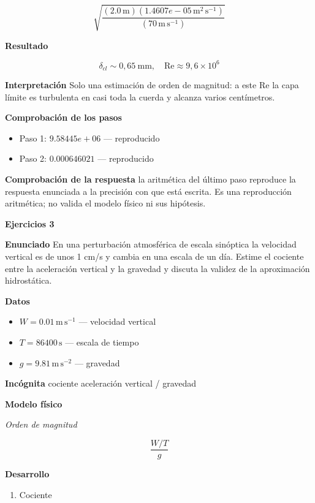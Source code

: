 \documentclass[10pt,openany]{book}
\begin{document}
\[
\sqrt{\frac{\left(2.0\,\mathrm{m}\right) \left(1.4607e-05\,\mathrm{m}^{2}\,\mathrm{s}^{-1}\right)}{\left(70\,\mathrm{m}\,\mathrm{s}^{-1}\right)}}
\]

\noindent\textbf{Resultado}

\[
\delta_{cl} \sim 0{,}65\ \mathrm{mm},\quad \mathrm{Re} \approx 9{,}6\times 10^{6}
\]

\noindent\textbf{Interpretación}
Solo una estimación de orden de magnitud: a este Re la capa límite es turbulenta en casi toda la cuerda y alcanza varios centímetros.

\noindent\textbf{Comprobación de los pasos}
\begin{itemize}
\item Paso 1: $9.58445e+06$ — reproducido
\item Paso 2: $0.000646021$ — reproducido
\end{itemize}

\noindent\textbf{Comprobación de la respuesta} la aritmética del último paso reproduce la respuesta enunciada a la precisión con que está escrita. Es una reproducción aritmética; no valida el modelo físico ni sus hipótesis.

\noindent\textbf{Ejercicios 3}

\noindent\textbf{Enunciado}
En una perturbación atmosférica de escala sinóptica la velocidad vertical es de unos 1 cm/s y cambia en una escala de un día. Estime el cociente entre la aceleración vertical y la gravedad y discuta la validez de la aproximación hidrostática.

\noindent\textbf{Datos}
\begin{itemize}
\item $W = 0.01\,\mathrm{m}\,\mathrm{s}^{-1}$ — velocidad vertical
\item $T = 86400\,\mathrm{s}$ — escala de tiempo
\item $g = 9.81\,\mathrm{m}\,\mathrm{s}^{-2}$ — gravedad
\end{itemize}

\noindent\textbf{Incógnita}
cociente aceleración vertical / gravedad

\noindent\textbf{Modelo físico}

\noindent\textit{Orden de magnitud}

\[
\frac{W/T}{g}
\]

\noindent\textbf{Desarrollo}
\begin{enumerate}
\item
Cociente
\end{enumerate}
\end{document}
